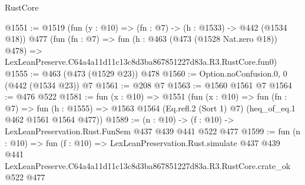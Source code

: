 \begin{lexlean}{RustCore}
\begin{coremodule}
@1551 := @1519
    (fun (y : @10) => (fn : @7) -> (h : @1533) -> @442 (@1534 @18))
    @477
    (fun (fn : @7) =>
    fun (h : @463 (@473 (@1528 Nat.zero @18)) @478) =>
    LexLeanPreserve.C64a4a11d11c13c8d3ba867851227d83a.R3.RustCore.fun0)
@1555 := @463 (@473 (@1529 @23)) @478
@1560 := Option.noConfusion.{0, 0} (@442 (@1534 @23)) @7
@1561 := @208 @7
@1563 := @1560 @1561 @7
@1564 := @476 @522
@1581 := fun (x : @10) =>
  @1551
    (fun (x : @10) =>
    fun (fn : @7) =>
    fun (h : @1555) => @1563 @1564 (Eq.refl.{2} (Sort 1) @7) (heq_of_eq.{1} @462 @1561 @1564 @477))
@1589 := (n : @10) -> (f : @10) -> LexLeanPreservation.Rust.FunSem @437 @439 @441 @522 @477
@1599 := fun (n : @10) =>
  fun (f : @10) =>
  LexLeanPreservation.Rust.simulate
    @437
    @439
    @441
    LexLeanPreserve.C64a4a11d11c13c8d3ba867851227d83a.R3.RustCore.crate_ok
    @522
    @477
\end{coremodule}
\end{lexlean}

